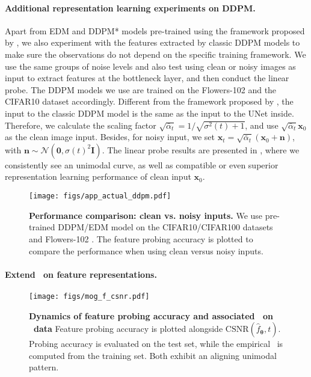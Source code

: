 \paragraph{Additional representation learning experiments on DDPM.}
Apart from EDM and DDPM* models pre-trained using the framework proposed by \citep{karras2022elucidating}, we also experiment with the features extracted by classic DDPM models \citep{ho2020denoising} to make sure the observations do not depend on the specific training framework. We use the same groups of noise levels and also test using clean or noisy images as input to extract features at the bottleneck layer, and then conduct the linear probe. The DDPM models we use are trained on the Flowers-102 \citep{nilsback2008automated} and the CIFAR10 dataset accordingly. Different from the framework proposed by \citep{karras2022elucidating}, the input to the classic DDPM model is the same as the input to the UNet inside. Therefore, we calculate the scaling factor $\sqrt{\bar{\alpha}_t} = 1/\sqrt{\sigma^2(t)+1}$, and use $\sqrt{\bar{\alpha}_t} \bm x_0$ as the clean image input. Besides, for noisy input, we set $\bm x_t = \sqrt{\bar{\alpha}_t} (\bm x_0 + \bm n)$, with $\boldsymbol{n} \sim \mathcal{N}\left(\mathbf{0}, \sigma(t)^2 \mathbf{I}\right)$. The linear probe results are presented in , where we consistently see an unimodal curve, as well as compatible or even superior representation learning performance of clean input $\bm x_0$.

\begin{figure}[t]
    \centering
    \texttt{[image: figs/app\_actual\_ddpm.pdf]}
    \caption{\textbf{Performance comparison: clean vs. noisy inputs.} We use pre-trained DDPM/EDM model on the CIFAR10/CIFAR100 datasets and Flowers-102 \citep{nilsback2008automated}. The feature probing accuracy is plotted to compare the performance when using clean versus noisy inputs.}
    \label{fig:ddpm_actual}
\end{figure}


\paragraph{Extend \CSNR~on feature representations.}
\begin{figure*}[h]
\centering
\texttt{[image: figs/mog\_f\_csnr.pdf]}
\caption{\textbf{Dynamics of feature probing accuracy and associated \CSNR~on \MoLRG~data} Feature probing accuracy is plotted alongside $\mathrm{CSNR}(\hat{f}_{\bm \theta},t)$. Probing accuracy is evaluated on the test set, while the empirical \CSNR~is computed from the training set. Both exhibit an aligning unimodal pattern.} \label{fig:mog_2}
\end{figure*}

